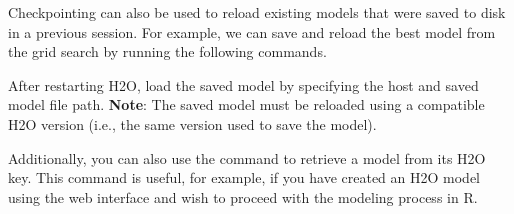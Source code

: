 \waterExampleInR


\waterExampleInPython


\noindent
Checkpointing can also be used to reload existing models that were saved to disk in a previous session. For example, we can save and reload the best model from the grid search by running the following commands.

%
%
\waterExampleInR


\waterExampleInPython



\normalsize

\noindent
After restarting  H2O, load the saved model by specifying the host and saved model file path. \textbf{Note}: The saved model must be reloaded using a compatible H2O version (i.e., the same version used to save the model).

%
%
\normalsize
\waterExampleInR


\waterExampleInPython




\noindent
Additionally, you can also use the command
%
\noindent
to retrieve a model from its H2O key. This command is useful, for example, if you have created an H2O model using the web interface and wish to proceed with the modeling process in R.

